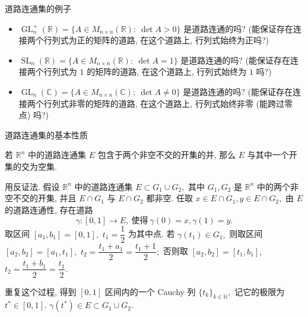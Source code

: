 \begin{frame}{道路连通集的例子}

\begin{question}
\begin{itemize}
\item $\operatorname{GL}_n^+(\mathbb{R}) = \{A \in M_{n\times n}(\mathbb{R}): ~ \det A > 0\}$ 是道路连通的吗?
\pause
\newline
\hspace{3em} (能保证存在连接两个行列式为正的矩阵的道路, 在这个道路上, 行列式始终为正吗?)
\pause
\vspace{1em}
\item $\operatorname{SL}_n(\mathbb{R}) = \{A \in M_{n\times n}(\mathbb{R}): ~ \det A = 1\}$ 是道路连通的吗?
\pause
\newline
\hspace{3em} (能保证存在连接两个行列式为 $1$ 的矩阵的道路, 在这个道路上, 行列式始终为 $1$ 吗?)
\pause
\vspace{1em}
\item $\operatorname{GL}_n(\mathbb{C}) = \{A \in M_{n\times n}(\mathbb{C}): ~ \det A \neq 0\}$ 是道路连通的吗?
\pause
\newline
\hspace{3em} (能保证存在连接两个行列式非零的矩阵的道路, 在这个道路上, 行列式始终非零 (能跨过零点) 吗?)
\end{itemize}
\end{question}

\end{frame}


\begin{frame}{道路连通集的基本性质}

\begin{prop}
若 $\mathbb{R}^n$ 中的道路连通集 $E$ 包含于两个非空不交的开集的并, 那么 $E$ 与其中一个开集的交为空集.
\end{prop}

\pause
\vspace{0.5em}

\startproof[bg=yellow, fg=red]
用反证法. 假设 $\mathbb{R}^n$ 中的道路连通集 $E \subset G_1 \cup G_2,$ 其中 $G_1, G_2$ 是 $\mathbb{R}^n$ 中的两个非空不交的开集, 并且 $E \cap G_1$ 与 $E \cap G_2$ 都非空. 任取 $x \in E \cap G_1, y \in E \cap G_2,$ 由 $E$ 的道路连通性, 存在道路
\[\gamma: [0, 1] \to E, ~ \text{使得} ~ \gamma(0) = x, \gamma(1) = y.\]
取区间 $[a_1, b_1] = [0, 1],$ $t_1 = \dfrac{1}{2}$ 为其中点. 若 $\gamma(t_1) \in G_1,$ 则取区间 $[a_2, b_2] = [a_1, t_1],$ $t_2 = \dfrac{t_1 + a_1}{2} = \dfrac{t_1 + 1}{2};$  否则取 $[a_2, b_2] = [t_1, b_1],$ $t_2 = \dfrac{t_1 + b_1}{2} = \dfrac{t_1}{2}.$

\pause
\vspace{0.5em}

重复这个过程, 得到 $[0, 1]$ 区间内的一个 Cauchy 列 $\{t_k\}_{k \in \mathbb{N}},$ 记它的极限为 $t^*\in [0, 1].$ $\gamma(t^*) \in E \subset G_1 \cup G_2.$

\end{frame}

